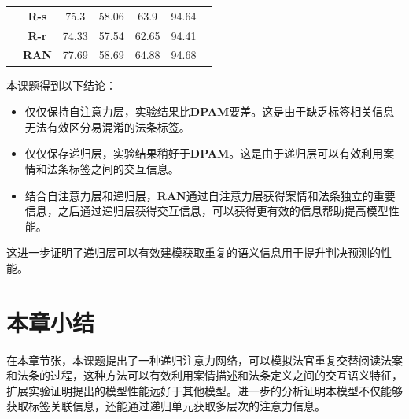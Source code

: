 \begin{table}[htbp]
\begin{tabular}{ccccccc}
                                                                                        & \textbf{R-s}    & 75.3        & 58.06 & 63.9   & 94.64       \\
                                                                                        & \textbf{R-r}    & 74.33       & 57.54 & 62.65  & 94.41       \\
                                                                                        & \textbf{RAN}    & 77.69       & 58.69 & 64.88  & 94.68       \\ \hline
        \end{tabular}
\end{table}
本课题得到以下结论：\
\begin{itemize}
    \item 仅仅保持自注意力层，实验结果比\textbf{DPAM}要差。这是由于缺乏标签相关信息无法有效区分易混淆的法条标签。
    \item 仅仅保存递归层，实验结果稍好于\textbf{DPAM}。这是由于递归层可以有效利用案情和法条标签之间的交互信息。
    \item 结合自注意力层和递归层，\textbf{RAN}通过自注意力层获得案情和法条独立的重要信息，之后通过递归层获得交互信息，可以获得更有效的信息帮助提高模型性能。
\end{itemize}
这进一步证明了递归层可以有效建模获取重复的语义信息用于提升判决预测的性能。
\section{本章小结}
\label{sec:ran_conclu}
在本章节张，本课题提出了一种递归注意力网络，可以模拟法官重复交替阅读法案和法条的过程，这种方法可以有效利用案情描述和法条定义之间的交互语义特征，扩展实验证明提出的模型性能远好于其他模型。进一步的分析证明本模型不仅能够获取标签关联信息，还能通过递归单元获取多层次的注意力信息。

